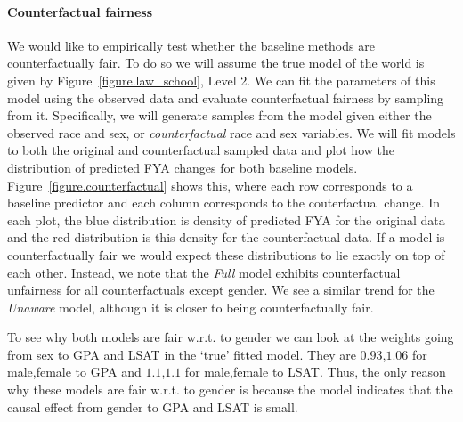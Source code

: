 \paragraph{Counterfactual fairness}
We would like to empirically test whether the baseline methods are counterfactually fair. To do so we will assume the true model of the world is given by Figure~\ref{figure.law_school}, Level 2. We can fit the parameters of this model using the observed data and evaluate counterfactual fairness by sampling from it. Specifically, we will generate samples from the model given either the observed race and sex, or \emph{counterfactual} race and sex variables. We will fit models to both the original and counterfactual sampled data and plot how the distribution of predicted FYA changes for both baseline models. Figure~\ref{figure.counterfactual} shows this, where each row corresponds to a baseline predictor and each column corresponds to the couterfactual change. In each plot, the blue distribution is density of predicted FYA for the original data and the red distribution is this density for the counterfactual data. If a model is counterfactually fair we would expect these distributions to lie exactly on top of each other. Instead, we note that the \emph{Full} model exhibits counterfactual unfairness for all counterfactuals except gender. We see a similar trend for the \emph{Unaware} model, although it is closer to being counterfactually fair.

To see why both models are fair w.r.t. to gender we can look at the weights going from sex to GPA and LSAT in the `true' fitted model. They are $0.93$,$1.06$ for male,female to GPA and $1.1$,$1.1$ for male,female to LSAT. Thus, the only reason why these models are fair w.r.t. to gender is because the model indicates that the causal effect from gender to GPA and LSAT is small.


 


